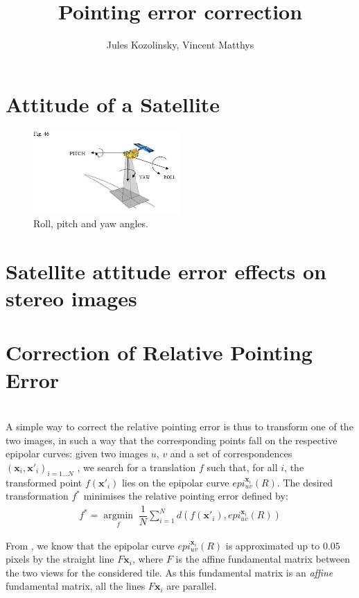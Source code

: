 \documentclass[paper=a4, fontsize=11pt]{article}
\title{\normalfont \normalsize 
\huge Pointing error correction}
\author{Jules Kozolinsky, Vincent Matthys}
\date{}
\newcommand{\argmin}[1]{\underset{#1}{\operatorname{argmin}}\;}
\begin{document}
\maketitle

\section{Attitude of a Satellite}

\begin{figure}[h]
	\centering
	\includegraphics[width=0.5\textwidth]{figures/angles.jpg}
   \caption{ Roll, pitch and yaw angles.}
   \label{angles}
\end{figure}

\section{Satellite attitude error effects on stereo images}
\label{sec:sensibility}

\section{Correction of Relative Pointing Error}
\cite{de2014automatic}\\

A simple way to correct the relative pointing error is thus to transform one of the two images, in such a way that the corresponding points fall on the respective epipolar curves: given two images $u$, $v$ and a set of correspondences $(\textbf{x}_i , \textbf{x}'_i)_{i=1...N}$ , we search for a translation $f$ such that, for all $i$, the transformed point $f(\textbf{x}'_i)$ lies on the epipolar curve $epi^{\textbf{x}_i}_{u v}(R)$.
The desired transformation $f^{*}$ minimises the relative pointing error defined by:
\begin{align}
\label{minif}
f^* = \argmin{f} \dfrac{1}{N} \sum\limits_{i=1}^{N} d(f(\textbf{x}'_i), epi^{\textbf{x}_i}_{u v}(R))
\end{align}

From  \cite{de2014automatic}, we know that the epipolar curve $epi^{\textbf{x}_i}_{u v}(R)$ is approximated up to $0.05$ pixels by the straight line $F\textbf{x}_i$, where $F$ is
the affine fundamental matrix between the two views for the considered tile. As this fundamental matrix is an \textit{affine} fundamental matrix, all the lines $F\textbf{x}_i$ are parallel. 
\end{document}
